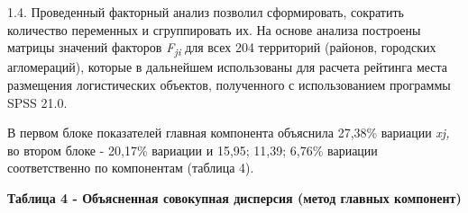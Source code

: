 1.4. Проведенный факторный анализ позволил сформировать, сократить
количество переменных и сгруппировать их. На основе анализа построены
матрицы значений факторов \emph{F\textsubscript{ji}} для всех 204
территорий (районов, городских агломераций), которые в дальнейшем
использованы для расчета рейтинга места размещения логистических
объектов, полученного с использованием программы SPSS 21.0.

В первом блоке показателей главная компонента объяснила 27,38\% вариации
\emph{xj,} во втором блоке - 20,17\% вариации и 15,95; 11,39; 6,76\%
вариации соответственно по компонентам (таблица 4).

{\bfseries Таблица 4 - Объясненная совокупная дисперсия (метод главных
компонент)}


